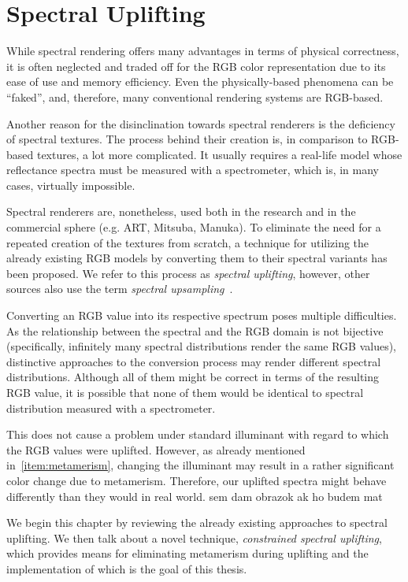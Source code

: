 \chapter{Spectral Uplifting}

While spectral rendering offers many advantages in terms of physical correctness, it is often neglected and traded off for the RGB color representation due to its ease of use and memory efficiency. Even the physically-based phenomena can be ``faked'', and, therefore, many conventional rendering systems are RGB-based. 

Another reason for the disinclination towards spectral renderers is the deficiency of spectral textures. The process behind their creation is, in comparison to RGB-based textures, a lot more complicated. It usually requires a real-life model whose reflectance spectra must be measured with a spectrometer, which is, in many cases, virtually impossible.  

Spectral renderers are, nonetheless, used both in the research and in the commercial sphere (e.g. ART, Mitsuba, Manuka). To eliminate the need for a repeated creation of the textures from scratch, a technique for utilizing the already existing RGB models by converting them to their spectral variants has been proposed. We refer to this process as \emph{spectral uplifting}, however, other sources also use the term \emph{spectral upsampling}~\cite{sigmoidMethod}.

Converting an RGB value into its respective spectrum poses multiple difficulties. As the relationship between the spectral and the RGB domain is not bijective (specifically, infinitely many spectral distributions render the same RGB values), distinctive approaches to the conversion process may render different spectral distributions. Although all of them might be correct in terms of the resulting RGB value, it is possible that none of them would be identical to spectral distribution measured with a spectrometer.

This does not cause a problem under standard illuminant with regard to which the RGB values were uplifted. However, as already mentioned in~\cref{item:metamerism}, changing the illuminant may result in a rather significant color change due to metamerism. Therefore, our uplifted spectra might behave differently than they would in real world. sem dam obrazok ak ho budem mat

We begin this chapter by reviewing the already existing approaches to spectral uplifting. We then talk about a novel technique, \emph{constrained spectral uplifting}, which provides means for eliminating metamerism during uplifting and the implementation of which is the goal of this thesis.

